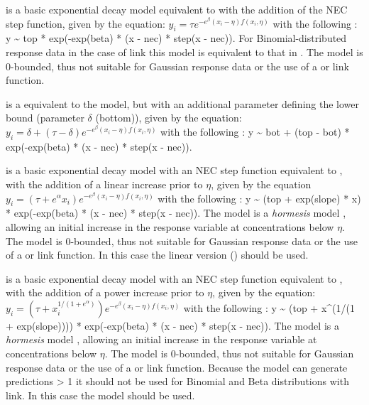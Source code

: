 \documentclass[
  shortnames]{jss}
\begin{document}
 is a basic exponential decay model equivalent to  with the addition of the NEC step function, given by the equation:
\(y_i = \tau e^{-e^{\beta} \left(x_i - \eta \right) f(x_i, \eta)}\)
with the following : y \textasciitilde{} top * exp(-exp(beta) * (x - nec) * step(x - nec)). For Binomial-distributed response data in the case of  link this model is equivalent to that in \citet{Fox2010}. The model is 0-bounded, thus not suitable for Gaussian response data or the use of a  or  link function.

 is a equivalent to the  model, but with an additional parameter defining the lower bound (parameter \(\delta\) (bottom)), given by the equation:
\(y_i = \delta + (\tau - \delta) e^{-e^{\beta} \left(x_i - \eta \right) f(x_i, \eta)}\)
with the following : y \textasciitilde{} bot + (top - bot) * exp(-exp(beta) * (x - nec) * step(x - nec)).

 is a basic exponential decay model with an NEC step function equivalent to , with the addition of a linear increase prior to \(\eta\), given by the equation
\(y_i = (\tau + e^{\alpha} x_i) e^{-e^{\beta} \left(x_i - \eta \right) f(x_i, \eta)}\)
with the following : y \textasciitilde{} (top + exp(slope) * x) * exp(-exp(beta) * (x - nec) * step(x - nec)). The  model is a \emph{hormesis} model \citep{Mattson2008}, allowing an initial increase in the response variable at concentrations below \(\eta\). The model is 0-bounded, thus not suitable for Gaussian response data or the use of a  or  link function. In this case the linear version () should be used.

 is a basic exponential decay model with an NEC step function equivalent to , with the addition of a power increase prior to \(\eta\), given by the equation:
\(y_i = (\tau + x_i^{1/(1+e^{\alpha})}) e^{-e^{\beta} \left(x_i - \eta \right) f(x_i, \eta)}\)
with the following : y \textasciitilde{} (top + x\^{}(1/(1 + exp(slope)))) * exp(-exp(beta) * (x - nec) * step(x - nec)). The  model is a \emph{hormesis} model \citep{Mattson2008}, allowing an initial increase in the response variable at concentrations below \(\eta\). The model is 0-bounded, thus not suitable for Gaussian response data or the use of a  or  link function. Because the model can generate predictions \textgreater{} 1 it should not be used for Binomial and Beta distributions with  link. In this case the  model should be used.
\end{document}
